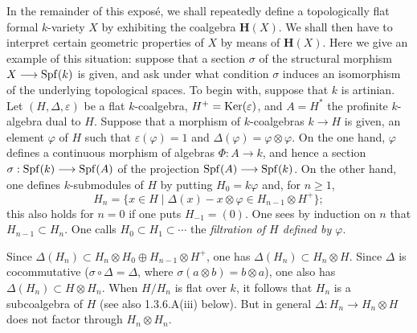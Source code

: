 In the remainder of this exposé, we shall repeatedly define a topologically flat formal $k$-variety $X$ by exhibiting the coalgebra $\mathbf H(X)$. We shall then have to interpret certain geometric properties of $X$ by means of $\mathbf H(X)$. Here we give an example of this situation: suppose that a section $\sigma$ of the structural morphism $X\longrightarrow\operatorname{Spf}(k)$ is given, and ask under what condition $\sigma$ induces an isomorphism of the underlying topological spaces.
To begin with, suppose that $k$ is artinian. Let $(H,\Delta,\varepsilon)$ be a flat $k$-coalgebra, $H^+=\operatorname{Ker}(\varepsilon)$, and $A=H^*$ the profinite $k$-algebra dual to $H$. Suppose that a morphism of $k$-coalgebras $k\to H$ is given, \ie an element $\varphi$ of $H$ such that $\varepsilon(\varphi)=1$ and $\Delta(\varphi)=\varphi\otimes\varphi$. On the one hand, $\varphi$ defines a continuous morphism of algebras $\Phi:A\to k$, and hence a section $\sigma:\operatorname{Spf}(k)\longrightarrow\operatorname{Spf}(A)$ of the projection $\operatorname{Spf}(A)\longrightarrow\operatorname{Spf}(k)$.
On the other hand, one defines $k$-submodules of $H$ by putting $H_0=k\varphi$ and, for $n\geq1$,
\[
H_n=\{x\in H\mid\Delta(x)-x\otimes\varphi\in H_{n-1}\otimes H^+\};
\]
this also holds for $n=0$ if one puts $H_{-1}=(0)$. One sees by induction on $n$ that $H_{n-1}\subset H_n$. One calls $H_0\subset H_1\subset\cdots$ the \emph{filtration of $H$ defined by $\varphi$}.
\begin{remark}{}
Since $\Delta(H_n)\subset H_n\otimes H_0\oplus H_{n-1}\otimes H^+$, one has $\Delta(H_n)\subset H_n\otimes H$. Since $\Delta$ is cocommutative (\ie $\sigma\circ\Delta=\Delta$, where $\sigma(a\otimes b)=b\otimes a$), one also has $\Delta(H_n)\subset H\otimes H_n$. When $H/H_n$ is flat over $k$, it follows that $H_n$ is a subcoalgebra of $H$ (see also 1.3.6.A(iii) below). But in general $\Delta:H_n\to H_n\otimes H$ does not factor through $H_n\otimes H_n$.
\end{remark}
